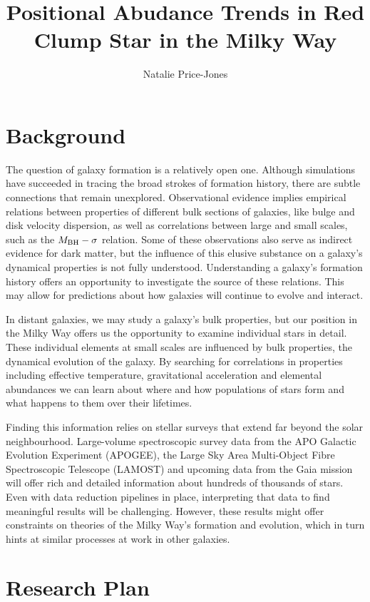 \documentclass[manuscript]{aastex}
\begin{document}
\title{Positional Abudance Trends in Red Clump Star in the Milky Way}
\author{Natalie Price-Jones}

\section{Background}
The question of galaxy formation is a relatively open one. Although simulations have succeeded in tracing the broad strokes of formation history, there are subtle connections that remain unexplored. Observational evidence implies empirical relations between properties of different bulk sections of galaxies, like bulge and disk velocity dispersion, as well as correlations between large and small scales, such as the $M_{\rm BH}-\sigma$ relation. Some of these observations also serve as indirect evidence for dark matter, but the influence of this elusive substance on a galaxy's dynamical properties is not fully understood. Understanding a galaxy's formation history offers an opportunity to investigate the source of these relations. This may allow for predictions about how galaxies will continue to evolve and interact.

In distant galaxies, we may study a galaxy's bulk properties, but our position in the Milky Way offers us the opportunity to examine individual stars in detail. These individual elements at small scales are influenced by bulk properties, the dynamical evolution of the galaxy. By searching for correlations in properties including effective temperature, gravitational acceleration and elemental abundances we can learn about where and how populations of stars form and what happens to them over their lifetimes. 

Finding this information relies on stellar surveys that extend far beyond the solar neighbourhood. Large-volume spectroscopic survey data from the APO Galactic Evolution Experiment (APOGEE), the Large Sky Area Multi-Object Fibre Spectroscopic Telescope (LAMOST) and upcoming data from the Gaia mission will offer rich and detailed information about hundreds of thousands of stars. Even with data reduction pipelines in place, interpreting that data to find meaningful results will be challenging. However, these results might offer constraints on theories of the Milky Way's formation and evolution, which in turn hints at similar processes at work in other galaxies.  


\section{Research Plan}
\end{document}
